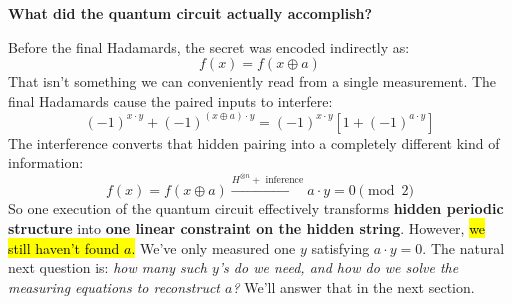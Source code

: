 \highspace
\begin{flushleft}
    \textcolor{Green3}{ \textbf{What did the quantum circuit actually accomplish?}}
\end{flushleft}
Before the final Hadamards, the secret was encoded indirectly as:
\begin{equation*}
    f(x) = f(x \oplus a)
\end{equation*}
That isn't something we can conveniently read from a single measurement. The final Hadamards cause the paired inputs to interfere:
\begin{equation*}
    (-1)^{x \cdot y} + (-1)^{(x\oplus a) \cdot y}
    =
    (-1)^{x \cdot y} \left[1 + (-1)^{a \cdot y}\right]
\end{equation*}
The interference converts that hidden pairing into a completely different kind of information:
\begin{equation*}
    f(x) = f(x \oplus a) \xrightarrow{H^{\otimes n} + \text{ inference}} a \cdot y = 0 \pmod 2
\end{equation*}
So one execution of the quantum circuit effectively transforms \textbf{hidden periodic structure} into \textbf{one linear constraint on the hidden string}. However, \hl{we still haven't found $a$.} We've only measured one $y$ satisfying $a \cdot y = 0$. The natural next question is: \emph{how many such $y$'s do we need, and how do we solve the measuring equations to reconstruct $a$?} We'll answer that in the next section.
